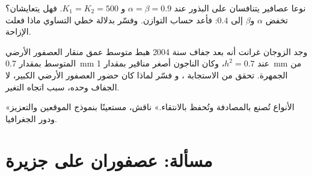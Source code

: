 \begin{exercise}[$\star\star\star$]\label{exo:b2:speciation:10}
نوعا عصافير يتنافسان على البذور عند $\alpha = \beta = 0.9$ و
$K_1 = K_2 = 500$. فهل يتعايشان؟  تخفض
$\alpha$ و$\beta$ إلى $0.4$: فأعد حساب التوازن. وفسّر
بدلالة خطي التساوي ماذا فعلت الإزاحة.
\end{exercise}

\begin{exercise}[$\star\star\star$]\label{exo:b2:speciation:11}
وجد الزوجان غرانت أنه بعد جفاف سنة 2004 هبط متوسط عمق
منقار العصفور الأرضي المتوسط بمقدار \qty{0.7}{mm} عند $h^{2} = 0.7$،
وكان الناجون أصغر مناقير بمقدار \qty{1}{mm} من
الجمهرة. تحقق من الاستجابة ، و
فسّر لماذا كان حضور العصفور الأرضي الكبير، لا الجفاف
وحده، سبب اتجاه التغير.
\end{exercise}

\begin{exercise}[$\star\star\star$]\label{exo:b2:speciation:12}
«الأنواع تُصنع بالمصادفة وتُحفظ بالانتقاء.» ناقش،
مستعينًا بنموذج الموقعين والتعزيز ودور الجغرافيا.
\end{exercise}

\section{مسألة: عصفوران على جزيرة}

